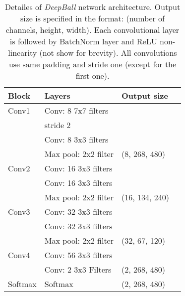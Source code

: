 \documentclass[a4paper,twoside]{article}
\begin{document}
\begin{table}[ht]
\caption{Detailes of \emph{DeepBall} network architecture. Output size is specified in the format: (number of channels, height, width).
Each convolutional layer is followed by BatchNorm layer and ReLU non-linearity (not show for brevity).
All convolutions use same padding and stride one (except for the first one).
}
\begin{center}
\begin{tabular}{l@{\quad}l@{\quad}l@{\quad}l}
\hline
Block & Layers & Output size \\
 \hline
Conv1  &  Conv: 8 7x7 filters &  \\
       &                  stride 2 & \\
       & Conv: 8 3x3 filters &  \\
       & Max pool: 2x2 filter & (8, 268, 480)\\
Conv2  &  Conv: 16 3x3 filters    &   \\
       & Conv: 16 3x3 filters &  \\
       & Max pool: 2x2 filter  & (16, 134, 240)\\
Conv3  &  Conv: 32 3x3 filters   &   \\
       & Conv: 32 3x3 filters & \\
       & Max pool: 2x2 filter  & (32, 67, 120)\\
Conv4   &  Conv: 56 3x3 filters    &  \\
        &  Conv: 2 3x3 Filters    &  (2, 268, 480) \\
Softmax &  Softmax & (2, 268, 480) \\
[2pt]
\hline
\end{tabular}
\end{center}
\label{jk:table2}
\end{table}
\end{document}
